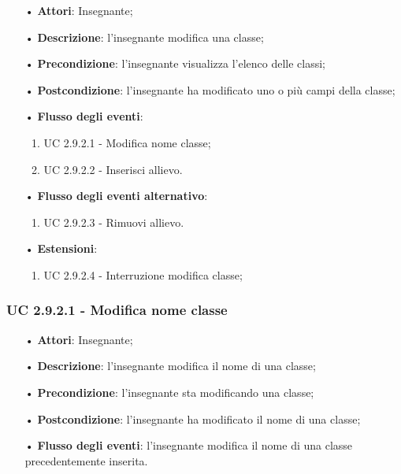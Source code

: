 \begin{itemize}
	\item[•] \textbf{Attori}: Insegnante;
	\item[•] \textbf{Descrizione}: l'insegnante modifica una classe;
	\item[•] \textbf{Precondizione}: l'insegnante visualizza l'elenco delle classi;
	\item[•] \textbf{Postcondizione}: l'insegnante ha modificato uno o più campi della classe;
	\item[•] \textbf{Flusso degli eventi}:
	\begin{enumerate}
		\item UC 2.9.2.1 - Modifica nome classe;
		\item UC 2.9.2.2 - Inserisci allievo.
	\end{enumerate}
	\item[•] \textbf{Flusso degli eventi alternativo}:
	\begin{enumerate}
		\item UC 2.9.2.3 - Rimuovi allievo.
	\end{enumerate}
	\item[•] \textbf{Estensioni}:	
	\begin{enumerate}
		\item UC 2.9.2.4 - Interruzione modifica classe;
	\end{enumerate}
\end{itemize}

\subsubsection{UC 2.9.2.1 - Modifica nome classe}
\begin{itemize}
	\item[•] \textbf{Attori}: Insegnante;
	\item[•] \textbf{Descrizione}: l'insegnante modifica il nome di una classe;
	\item[•] \textbf{Precondizione}: l'insegnante sta modificando una classe;
	\item[•] \textbf{Postcondizione}: l'insegnante ha modificato il nome di una classe;
	\item[•] \textbf{Flusso degli eventi}: l'insegnante modifica il nome di una classe precedentemente inserita.
\end{itemize}

